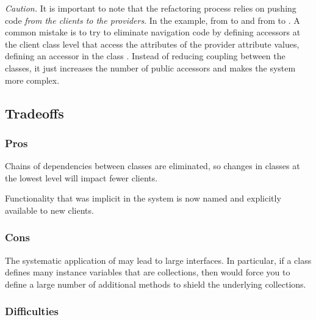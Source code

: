 \documentclass[a4paper,10pt,twoside]{book}
\begin{document}
\noindent
\emph{Caution.}
It is important to note that the refactoring process relies on pushing code \emph{from the clients to the providers}. In the example, from  to  and from  to . A common mistake is to try to eliminate navigation code by defining accessors at the client class level that access the attributes of the provider attribute values, \eg defining an accessor  in the class . Instead of reducing coupling between the classes, it just increases the number of public accessors and makes the system more complex.

\subsection*{Tradeoffs}

\subsubsection*{Pros}

\begin{bulletlist}
\item Chains of dependencies between classes are eliminated, so changes in classes at the lowest level will impact fewer clients.

\item Functionality that was implicit in the system is now named and explicitly available to new clients.
\end{bulletlist}

\subsubsection*{Cons}

\begin{bulletlist}
\item The systematic application of  may lead to large interfaces. In particular, if a class defines many instance variables that are collections, then  would force you to define a large number of additional methods to shield the underlying collections. 
\end{bulletlist}

\subsubsection*{Difficulties}
\end{document}
